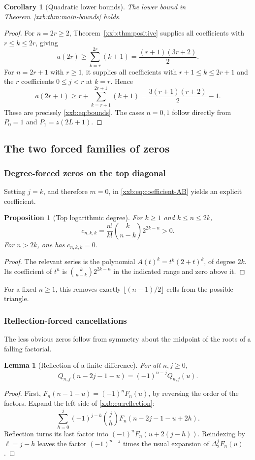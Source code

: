 \documentclass[11pt,a4paper]{article}
\numberwithin{equation}{section}
\newtheorem{proposition}[theorem]{Proposition}
\newtheorem{lemma}[theorem]{Lemma}
\newtheorem{corollary}[theorem]{Corollary}
\theoremstyle{definition}
\theoremstyle{remark}
\theoremstyle{plain}
\begin{document}
\begin{corollary}[Quadratic lower bounds]\label{xxb:cor:lower}
The lower bound in Theorem~\ref{xxb:thm:main-bounds} holds.
\end{corollary}
\begin{proof}
For $n=2r\ge2$, Theorem~\ref{xxb:thm:positive} supplies all coefficients with
$r\le k\le2r$, giving
\[
 a(2r)\ge\sum_{k=r}^{2r}(k+1)=\frac{(r+1)(3r+2)}2.
\]
For $n=2r+1$ with $r\ge1$, it supplies all coefficients with
$r+1\le k\le2r+1$ and the $r$ coefficients $0\le j<r$ at $k=r$.
Hence
\[
 a(2r+1)\ge r+\sum_{k=r+1}^{2r+1}(k+1)
 =\frac{3(r+1)(r+2)}2-1.
\]
These are precisely \eqref{xxb:eq:bounds}. The cases $n=0,1$ follow directly
from $P_0=1$ and $P_1=z(2L+1)$.
\end{proof}

\subsection{The two forced families of zeros}\label{xxb:sec:zeros}
\subsubsection{Degree-forced zeros on the top diagonal}
Setting $j=k$, and therefore $m=0$, in \eqref{xxb:eq:coefficient-AB} yields
an explicit coefficient.
\begin{proposition}[Top logarithmic degree]\label{xxb:prop:top}
For $k\ge1$ and $k\le n\le2k$,
\begin{equation}\label{xxb:eq:top}
 c_{n,k,k}=\frac{n!}{k!}\binom{k}{n-k}2^{2k-n}>0.
\end{equation}
For $n>2k$, one has $c_{n,k,k}=0$.
\end{proposition}
\begin{proof}
The relevant series is the polynomial
$A(t)^k=t^k(2+t)^k$, of degree $2k$. Its coefficient of $t^n$ is
$\binom{k}{n-k}2^{2k-n}$ in the indicated range and zero above it.
\end{proof}
For a fixed $n\ge1$, this removes exactly
$\lfloor(n-1)/2\rfloor$ cells from the possible triangle.

\subsubsection{Reflection-forced cancellations}
The less obvious zeros follow from symmetry about the midpoint of the
roots of a falling factorial.
\begin{lemma}[Reflection of a finite difference]\label{xxb:lem:reflection}
For all $n,j\ge0$,
\begin{equation}\label{xxb:eq:reflection}
 Q_{n,j}(n-2j-1-u)=(-1)^{n-j}Q_{n,j}(u).
\end{equation}
\end{lemma}
\begin{proof}
First,
$F_n(n-1-u)=(-1)^nF_n(u)$, by reversing the order of the factors.
Expand the left side of \eqref{xxb:eq:reflection}:
\[
 \sum_{h=0}^j(-1)^{j-h}\binom jh
 F_n(n-2j-1-u+2h).
\]
Reflection turns its last factor into
$(-1)^nF_n(u+2(j-h))$. Reindexing by $\ell=j-h$ leaves the factor
$(-1)^{n-j}$ times the usual expansion of $\Delta_2^jF_n(u)$.
\end{proof}
\end{document}
